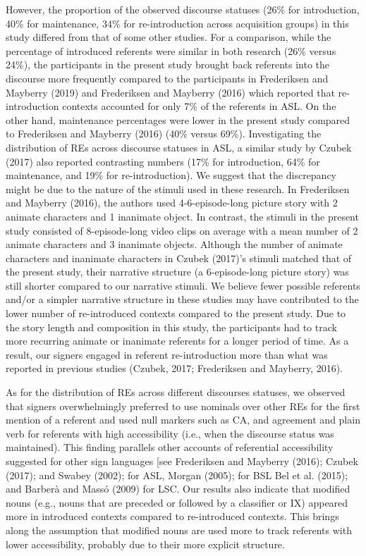 \documentclass[]{elsarticle} %
\begin{document}
However, the proportion of the observed discourse statuses (26\% for
introduction, 40\% for maintenance, 34\% for re-introduction across
acquisition groups) in this study differed from that of some other
studies. For a comparison, while the percentage of introduced referents
were similar in both research (26\% versus 24\%), the participants in
the present study brought back referents into the discourse more
frequently compared to the participants in Frederiksen and Mayberry
(2019) and Frederiksen and Mayberry (2016) which reported that
re-introduction contexts accounted for only 7\% of the referents in ASL.
On the other hand, maintenance percentages were lower in the present
study compared to Frederiksen and Mayberry (2016) (40\% versus 69\%).
Investigating the distribution of REs across discourse statuses in ASL,
a similar study by Czubek (2017) also reported contrasting numbers (17\%
for introduction, 64\% for maintenance, and 19\% for re-introduction).
We suggest that the discrepancy might be due to the nature of the
stimuli used in these research. In Frederiksen and Mayberry (2016), the
authors used 4-6-episode-long picture story with 2 animate characters
and 1 inanimate object. In contrast, the stimuli in the present study
consisted of 8-episode-long video clips on average with a mean number of
2 animate characters and 3 inanimate objects. Although the number of
animate characters and inanimate characters in Czubek (2017)'s stimuli
matched that of the present study, their narrative structure (a
6-episode-long picture story) was still shorter compared to our
narrative stimuli. We believe fewer possible referents and/or a simpler
narrative structure in these studies may have contributed to the lower
number of re-introduced contexts compared to the present study. Due to
the story length and composition in this study, the participants had to
track more recurring animate or inanimate referents for a longer period
of time. As a result, our signers engaged in referent re-introduction
more than what was reported in previous studies (Czubek, 2017;
Frederiksen and Mayberry, 2016).

As for the distribution of REs across different discourses statuses, we
observed that signers overwhelmingly preferred to use nominals over
other REs for the first mention of a referent and used null markers such
as CA, and agreement and plain verb for referents with high
accessibility (i.e., when the discourse status was maintained). This
finding parallels other accounts of referential accessibility suggested
for other sign languages {[}see Frederiksen and Mayberry (2016); Czubek
(2017); and Swabey (2002); for ASL, Morgan (2005); for BSL Bel et al.
(2015); and Barberà and Massó (2009) for LSC. Our results also indicate
that modified nouns (e.g., nouns that are preceded or followed by a
classifier or IX) appeared more in introduced contexts compared to
re-introduced contexts. This brings along the assumption that modified
nouns are used more to track referents with lower accessibility,
probably due to their more explicit structure.
\end{document}
